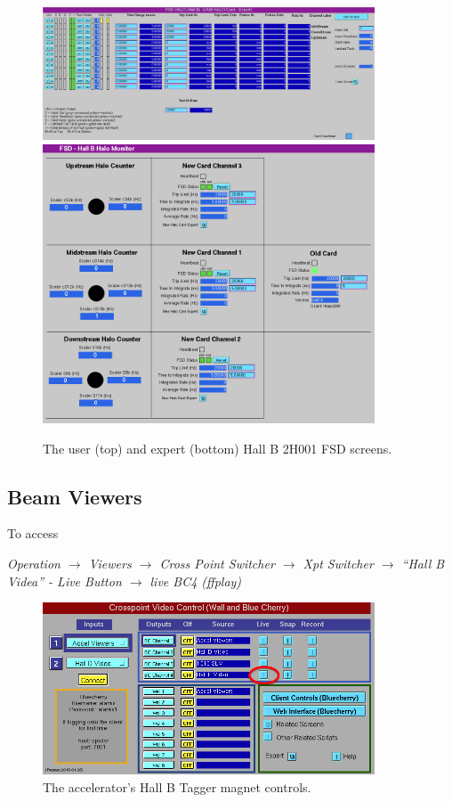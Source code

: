 \documentclass[amsmath,amssymb,notitlepage,11pt]{revtex4}
\begin{document}
\begin{figure}[htbp]\centering
    \includegraphics[width=0.88\textwidth]{pics/fsduser}\vspace{2mm}
  \includegraphics[width=0.88\textwidth]{pics/fsdexpert}
  \caption{The user (top) and expert (bottom) Hall B 2H001 FSD screens.\label{fig:fsd}}
\end{figure}
    \subsection{Beam Viewers} To access 
    \begin{center}{\em Operation $\to$ Viewers $\to$ Cross Point Switcher $\to$ Xpt Switcher $\to$ ``Hall B Videa'' - Live Button $\to$ live BC4 (ffplay) }\end{center}

\begin{figure}[htbp]\centering
  \includegraphics[width=0.88\textwidth]{pics/viewer}
  \caption{The accelerator's Hall B Tagger magnet controls.\label{fig:viewer}}
\end{figure}


%
\end{document}
